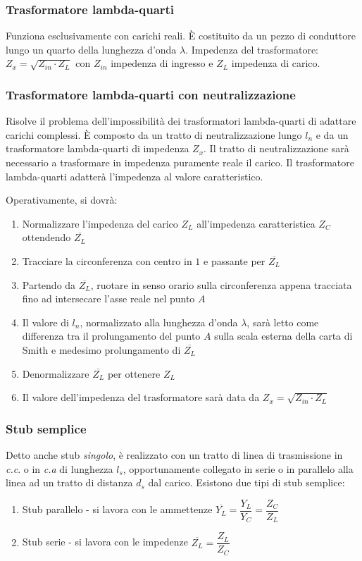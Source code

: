 \documentclass{article}
\begin{document}
\subsubsection{Trasformatore lambda-quarti}
Funziona esclusivamente con carichi reali. \`E costituito da un pezzo di conduttore lungo un quarto della lunghezza d'onda \( \lambda \).
Impedenza del trasformatore: \(\displaystyle  Z_x = \sqrt{Z_{in} \cdot Z_L} \) con \(Z_{in}\) impedenza di ingresso e \(Z_L\) impedenza di carico.

\subsubsection{Trasformatore lambda-quarti con neutralizzazione}
Risolve il problema dell'impossibilità dei trasformatori lambda-quarti di adattare carichi complessi.
\`E composto da un tratto di neutralizzazione lungo \(l_n\) e da un trasformatore lambda-quarti di impedenza \(Z_x\).
Il tratto di neutralizzazione sarà necessario a trasformare in impedenza puramente reale il carico.
Il trasformatore lambda-quarti adatterà l'impedenza al valore caratteristico.

Operativamente, si dovrà:
\begin{enumerate}
	\item Normalizzare l'impedenza del carico \(Z_L\) all'impedenza caratteristica \(Z_C\) ottendendo \(\overline{Z_L}\)
	\item Tracciare la circonferenza con centro in \(1\) e passante per \( \overline{Z_L} \)
	\item Partendo da \(\overline{Z_L}\), ruotare in senso orario sulla circonferenza appena tracciata fino ad intersecare l'asse reale nel punto \(A\)
	\item Il valore di \( l_n \), normalizzato alla lunghezza d'onda \( \lambda \), sarà letto come differenza tra il prolungamento del punto \(A\) sulla scala esterna della carta di Smith e medesimo prolungamento di \(\overline{Z_L}\)
	\item Denormalizzare \(\overline{Z_L}\) per ottenere \(Z_L\)
	\item Il valore dell'impedenza del trasformatore sarà data da \(\displaystyle Z_x = \sqrt{Z_{in} \cdot Z_L} \)
\end{enumerate}

\subsubsection{Stub semplice}
Detto anche stub \textit{singolo}, è realizzato con un tratto di linea di trasmissione in \textit{c.c}. o in \textit{c.a} di lunghezza \(l_s\), opportunamente collegato in serie o in parallelo alla linea ad un tratto di distanza \(d_s\) dal carico.
Esistono due tipi di stub semplice:
\begin{enumerate}
	\item Stub parallelo - si lavora con le ammettenze \( \overline{Y_L} = \dfrac{Y_L}{Y_C} = \dfrac{Z_C}{Z_L} \) 
	\item Stub serie - si lavora con le impedenze \( \overline{Z_L} = \dfrac{Z_L}{Z_C} \)
\end{enumerate}
\end{document}
